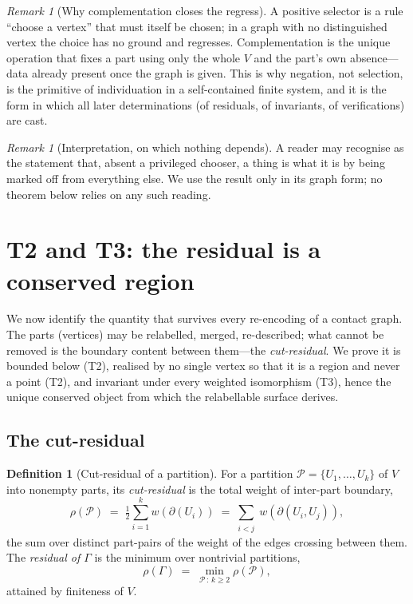 \documentclass[11pt,a4paper]{article}
\theoremstyle{thmstyle}
\theoremstyle{definition}
\newtheorem{definition}[theorem]{Definition}
\theoremstyle{remark}
\newtheorem{remark}[theorem]{Remark}
\newcommand{\Gph}{\Gamma}                 %
\newcommand{\V}{V}                        %
\newcommand{\wt}{w}                       %
\newcommand{\cut}{\partial}               %
\newcommand{\Res}{\rho}                   %
\begin{document}
\begin{remark}[Why complementation closes the regress]
\label{rem:regress}
A positive selector is a rule ``choose a vertex'' that must itself be chosen; in
a graph with no distinguished vertex the choice has no ground and regresses.
Complementation is the unique operation that fixes a part using only the whole
$\V$ and the part's own absence---data already present once the graph is given.
This is why negation, not selection, is the primitive of individuation in a
self-contained finite system, and it is the form in which all later
determinations (of residuals, of invariants, of verifications) are cast.
\end{remark}

\begin{remark}[Interpretation, on which nothing depends]
\label{rem:negation-interp}
A reader may recognise  as the statement that, absent a
privileged chooser, a thing is what it is by being marked off from everything
else. We use the result only in its graph form; no theorem below relies on any
such reading.
\end{remark}


\section{T2 and T3: the residual is a conserved region}
\label{sec:residual}

We now identify the quantity that survives every re-encoding of a contact graph.
The parts (vertices) may be relabelled, merged, re-described; what cannot be
removed is the boundary content between them---the \emph{cut-residual}. We prove
it is bounded below (T2), realised by no single vertex so that it is a region and
never a point (T2), and invariant under every weighted isomorphism (T3), hence
the unique conserved object from which the relabellable surface derives.

\subsection{The cut-residual}

\begin{definition}[Cut-residual of a partition]
\label{def:residual}
For a partition $\mathcal{P}=\{U_1,\dots,U_k\}$ of $\V$ into nonempty parts, its
\emph{cut-residual} is the total weight of inter-part boundary,
\[
\Res(\mathcal{P})\;=\;\tfrac12\sum_{i=1}^{k}\wt(\cut(U_i))
\;=\!\!\sum_{\substack{i<j}}\!\!\wt(\cut(U_i,U_j)),
\]
the sum over distinct part-pairs of the weight of the edges crossing between
them. The \emph{residual of $\Gph$} is the minimum over nontrivial partitions,
\[
\Res(\Gph)\;=\;\min_{\mathcal{P}\,:\,k\ge 2}\Res(\mathcal{P}),
\]
attained by finiteness of $\V$.
\end{definition}
\end{document}
